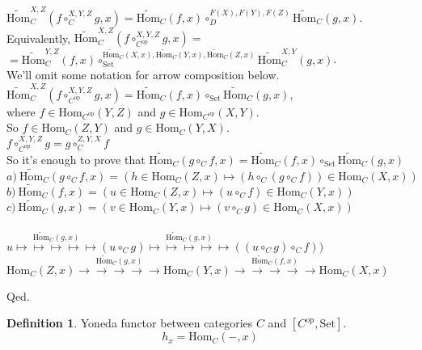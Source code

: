 \documentclass[10pt,a4paper]{article}
\theoremstyle{definition}
\newtheorem{definition}{Definition}[section]
\newcommand{\Hom}{{\mbox{Hom}}}
\newcommand{\HomMor}{{\widetilde{\Hom}\mbox{}}}
\newcommand{\op}{{\mbox{op}}}
\newcommand{\Set}{{\mbox{Set}}}
\begin{document}
\begin{enumerate}
$\HomMor_C^{X,Z}(f\circ_C^{X,Y,Z} g, x)=\HomMor_C(f,x)\circ_D^{F(X),F(Y),F(Z)} \HomMor_C(g,x)$.\\
Equivalently, $\HomMor_C^{X,Z}(f\circ_{C^\op}^{X,Y,Z} g, x)=$\\ $=\HomMor_C^{Y,Z}(f,x)\circ_\Set^{\HomMor_C(X,x),\HomMor_C(Y,x),\HomMor_C(Z,x)} \HomMor_C^{X,Y}(g,x)$.\\
We'll omit some notation for arrow composition below.\\
$\HomMor_C^{X,Z}(f\circ_{C^\op}^{X,Y,Z} g, x)=\HomMor_C(f,x)\circ_\Set \HomMor_C(g,x)$,\\
where $f\in\Hom_{C^\op}(Y,Z)$ and $g\in\Hom_{C^\op}(X,Y)$.\\
So $f\in\Hom_{C}(Z,Y)$ and $g\in\Hom_{C}(Y,X)$.\\
$f\circ_{C^\op}^{X,Y,Z} g = g\circ_{C}^{Z,Y,X} f$\\
So it's enough to prove that $\HomMor_C(g\circ_C f, x) = \HomMor_C(f, x) \circ_\Set \HomMor_C(g, x)$\\
$a)\ \HomMor_C(g\circ_C f, x) = (h \in\Hom_C(Z,x) \mapsto (h \circ_C (g\circ_C f))\in\Hom_C(X,x))$\\
$b)\ \HomMor_C(f, x) = \left(u \in\Hom_C(Z,x) \mapsto (u \circ_C f)\in\Hom_C(Y,x)\right)$\\
$c)\ \HomMor_C(g, x) = \left(v \in\Hom_C(Y,x) \mapsto (v \circ_C g)\in\Hom_C\left(X,x\right)\right)$\\
\\
$u \stackrel{\HomMor_C(g, x)}{\mapsto\mapsto\mapsto\mapsto\mapsto} (u \circ_C g)\stackrel{\HomMor_C(g, x)}{\mapsto\mapsto\mapsto\mapsto\mapsto} ((u \circ_C g) \circ_C f))$
\\
$\Hom_C(Z,x) \stackrel{\HomMor_C(g, x)}{\to\to\to\to\to} \Hom_C(Y,x)\stackrel{\HomMor_C(f, x)}{\to\to\to\to\to} \Hom_C(X,x)$
\\
\end{enumerate}
Qed.
\begin{definition}
Yoneda functor between categories $C$ and $[C^\op,\Set]$.
$$h_x = \Hom_C(-, x)$$
\end{definition}
\end{document}
